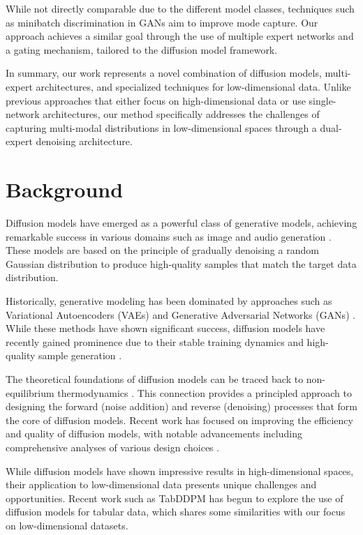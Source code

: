 \documentclass{article} %
\begin{document}
While not directly comparable due to the different model classes, techniques such as minibatch discrimination in GANs \cite{gan} aim to improve mode capture. Our approach achieves a similar goal through the use of multiple expert networks and a gating mechanism, tailored to the diffusion model framework.

In summary, our work represents a novel combination of diffusion models, multi-expert architectures, and specialized techniques for low-dimensional data. Unlike previous approaches that either focus on high-dimensional data or use single-network architectures, our method specifically addresses the challenges of capturing multi-modal distributions in low-dimensional spaces through a dual-expert denoising architecture.

\section{Background}
\label{sec:background}

Diffusion models have emerged as a powerful class of generative models, achieving remarkable success in various domains such as image and audio generation \cite{ddpm,yang2023diffusion}. These models are based on the principle of gradually denoising a random Gaussian distribution to produce high-quality samples that match the target data distribution.

Historically, generative modeling has been dominated by approaches such as Variational Autoencoders (VAEs) \cite{vae} and Generative Adversarial Networks (GANs) \cite{gan}. While these methods have shown significant success, diffusion models have recently gained prominence due to their stable training dynamics and high-quality sample generation \cite{ddpm}.

The theoretical foundations of diffusion models can be traced back to non-equilibrium thermodynamics \cite{pmlr-v37-sohl-dickstein15}. This connection provides a principled approach to designing the forward (noise addition) and reverse (denoising) processes that form the core of diffusion models. Recent work has focused on improving the efficiency and quality of diffusion models, with notable advancements including comprehensive analyses of various design choices \cite{edm}.

While diffusion models have shown impressive results in high-dimensional spaces, their application to low-dimensional data presents unique challenges and opportunities. Recent work such as TabDDPM \cite{kotelnikov2022tabddpm} has begun to explore the use of diffusion models for tabular data, which shares some similarities with our focus on low-dimensional datasets.
\end{document}

